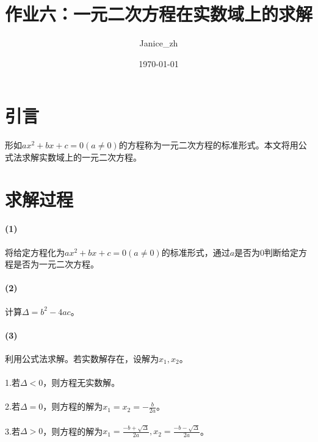 \documentclass{article}
\title{作业六：一元二次方程在实数域上的求解}
\author{Janice\_zh}
\date{\today}
\begin{document}
	\maketitle   %
	\section{引言}
形如$ax^2+bx+c=0 (a\neq0)$的方程称为一元二次方程的标准形式。本文将用公式法求解实数域上的一元二次方程。
	\section{求解过程}
	\paragraph{(1)}将给定方程化为$ax^2+bx+c=0 (a\neq0)$的标准形式，通过$a$是否为0判断给定方程是否为一元二次方程。
	\paragraph{(2)}计算$\Delta=b^2-4ac$。
	\paragraph{(3)}利用公式法求解。若实数解存在，设解为$x_1,x_2$。
	\paragraph{}1.若$\Delta<0$，则方程无实数解。
	\paragraph{}2.若$\Delta=0$，则方程的解为$x_1=x_2=-\frac{b}{2a}$。
	\paragraph{}3.若$\Delta>0$，则方程的解为$x_1=\frac{-b+\sqrt{\Delta}}{2a},x_2=\frac{-b-\sqrt{\Delta}}{2a}$。
\end{document}
